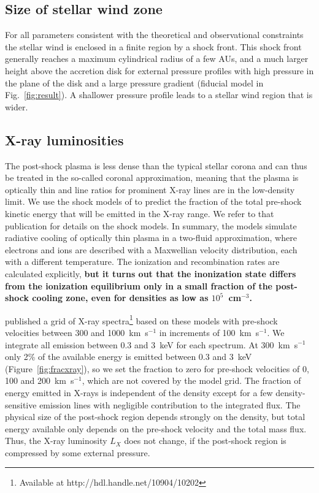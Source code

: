 \documentclass[manuscript]{aastex}
\begin{document}
\subsection{Size of stellar wind zone}
For all parameters consistent with the theoretical and observational constraints the stellar wind is enclosed in a finite region by a shock front. This shock front generally reaches a maximum cylindrical radius of a few AUs, and a much larger height above the accretion disk for external pressure profiles with high pressure in the plane of the disk and a large pressure gradient (fiducial model in Fig.~\ref{fig:result}). A shallower pressure profile leads to a stellar wind region that is wider. 

\subsection{X-ray luminosities}
\label{sect:LX}
The post-shock plasma is less dense than the typical stellar corona and can thus be treated in the so-called coronal approximation, meaning that the plasma is optically thin and line ratios for prominent X-ray lines are in the low-density limit. We use the shock models of \citet{2007A&A...466.1111G} to predict the fraction of the total pre-shock kinetic energy that will be emitted in the X-ray range. We refer to that publication for details on the shock models. In summary, the models simulate radiative cooling of optically thin plasma in a two-fluid approximation, where electrons and ions are described with a Maxwellian velocity distribution, each with a different temperature. The ionization and recombination rates are calculated explicitly, \textbf{ but it turns out that the inonization state differs from the ionization equilibrium only in a small fraction of the post-shock cooling zone, even for densities as low as $10^5$~cm$^{-3}$.}

\citet{2011AN....332..448G} published a grid of X-ray spectra\footnote{Available at http://hdl.handle.net/10904/10202} based on these models with pre-shock velocities between 300 and 1000~km~s$^{-1}$ in increments of 100~km~s$^{-1}$. We integrate all emission between 0.3 and 3~keV for each spectrum. At 300~km~s$^{-1}$ only 2\% of the available energy is emitted between 0.3 and 3~keV (Figure~\ref{fig:fracxray}), so we set the fraction to zero for pre-shock velocities of 0, 100 and 200~km~s$^{-1}$, which are not covered by the model grid. The fraction of energy emitted in X-rays is independent of the density except for a few density-sensitive emission lines with negligible contribution to the integrated flux. The physical size of the post-shock region depends strongly on the density, but total energy available only depends on the pre-shock velocity and the total mass flux. Thus, the X-ray luminosity $L_X$ does not change, if the post-shock region is compressed by some external pressure.
\end{document}
